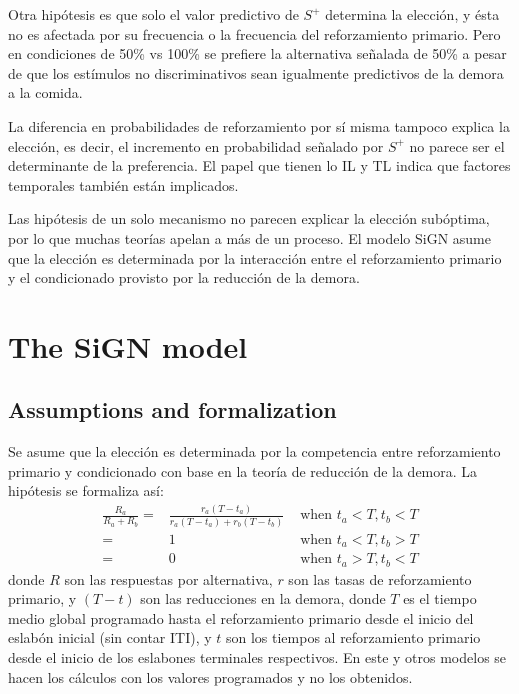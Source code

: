 \documentclass[a4paper,12pt]{article}
\begin{document}
Otra hipótesis es que solo el valor predictivo de $S^{+}$ determina la elección, y ésta no es afectada por su frecuencia o la frecuencia del reforzamiento primario.
Pero en condiciones de 50\% vs 100\% se prefiere la alternativa señalada de 50\% a pesar de que los estímulos no discriminativos sean igualmente predictivos de la demora a la comida.

La diferencia en probabilidades de reforzamiento por sí misma tampoco explica la elección, es decir, el incremento en probabilidad señalado por $S^{+}$ no parece ser el determinante de la preferencia.
El papel que tienen lo IL y TL indica que factores temporales también están implicados.

Las hipótesis de un solo mecanismo no parecen explicar la elección subóptima, por lo que muchas teorías apelan a más de un proceso.
El modelo SiGN asume que la elección es determinada por la interacción entre el reforzamiento primario y el condicionado provisto por la reducción de la demora.

\section{The SiGN model}

\subsection{Assumptions and formalization}

Se asume que la elección es determinada por la competencia entre reforzamiento primario y condicionado con base en la teoría de reducción de la demora.
La hipótesis se formaliza así:
\[
    \begin{array}{rlr}
        \frac{
            R_{a}
        }{
            R_{a} + R_{b}
        }=&
        \frac{
            r_{a}(T - t_{a})
        }{
            r_{a}(T - t_{a}) + r_{b}(T - t_{b})
        } &\mbox{ when }t_{a} < T, t_{b} < T\\
        =& 1 &\mbox{ when } t_{a} < T, t_{b} > T\\
        =& 0 & \mbox{ when } t_{a} > T, t_{b} < T
    \end{array}
\]
donde $R$ son las respuestas por alternativa, $r$ son las tasas de reforzamiento primario, y $(T - t)$ son las reducciones en la demora, donde $T$ es el tiempo medio global programado hasta el reforzamiento primario desde el inicio del eslabón inicial (sin contar ITI), y $t$ son los tiempos al reforzamiento primario desde el inicio de los eslabones terminales respectivos.
En este y otros modelos se hacen los cálculos con los valores programados y no los obtenidos.
\end{document}
